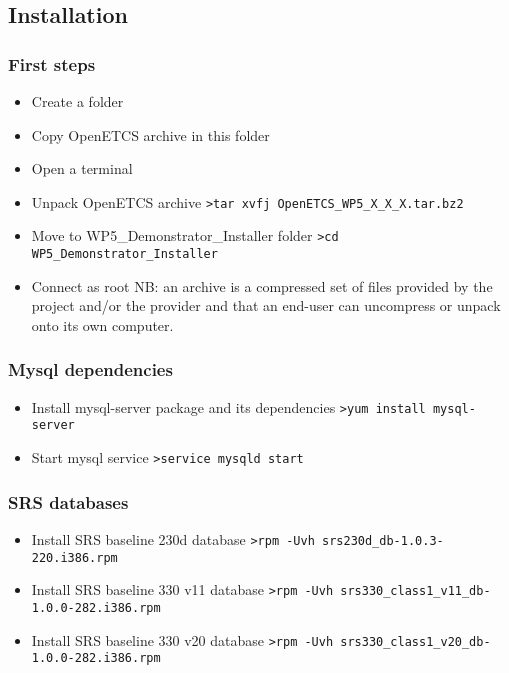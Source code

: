\documentclass{template/openetcs_article}
\begin{document}
\subsection{Installation}
\subsubsection{First steps}
\begin{itemize}
	\item Create a folder
	\item Copy OpenETCS archive in this folder
	\item Open a terminal
	\item Unpack OpenETCS archive
\newline	
\verb|>tar xvfj OpenETCS_WP5_X_X_X.tar.bz2 |
	\item Move to WP5\_Demonstrator\_Installer folder
\newline	
\verb|>cd WP5_Demonstrator_Installer |	
	\item Connect as root
\newline	
\newline NB: an archive is a compressed set of files provided by the project and/or the provider and that an end-user can uncompress or unpack onto its own computer.
\end{itemize}
\subsubsection{Mysql dependencies}
\begin{itemize}
	\item Install mysql-server package and its dependencies
	\newline
	\verb|>yum install mysql-server |
	\item Start mysql service
	\newline
	\verb|>service mysqld start |
\end{itemize}	
\subsubsection{SRS databases}
\begin{itemize}
	\item Install SRS baseline 230d database
	\newline
	\verb|>rpm -Uvh srs230d_db-1.0.3-220.i386.rpm |	
	\item Install SRS baseline 330 v11 database
	\newline
	\verb|>rpm -Uvh srs330_class1_v11_db-1.0.0-282.i386.rpm |	
	\item Install SRS baseline 330 v20 database
	\newline
	\verb|>rpm -Uvh srs330_class1_v20_db-1.0.0-282.i386.rpm |		
\end{itemize}	
\end{document}
